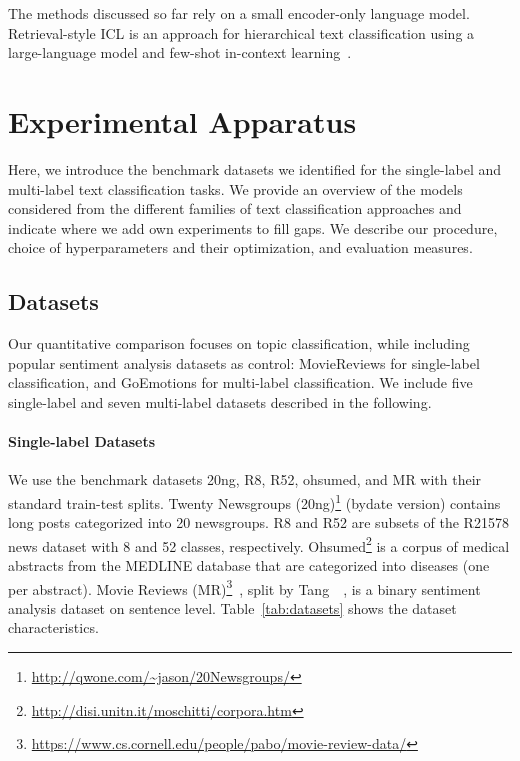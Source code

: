 \documentclass[acmsmall,nonacm]{acmart}
\begin{document}
The methods discussed so far rely on a small encoder-only language model.
Retrieval-style ICL is an approach for hierarchical text classification using a large-language model and few-shot in-context learning~\cite{DBLP:journals/corr/abs-2406-17534}.

\section{Experimental Apparatus}\label{sec:apparatus}

Here, we introduce the benchmark datasets we identified for the single-label and multi-label text classification tasks.
We provide an overview of the models considered from the different families of text classification approaches and indicate where we add own experiments to fill gaps.
We describe our procedure, choice of hyperparameters and their optimization, and evaluation measures.

\subsection{Datasets}\label{sec:datasets}

Our quantitative comparison focuses on topic classification, while including popular sentiment analysis datasets as control: MovieReviews for single-label classification, and GoEmotions for multi-label classification.
We include five single-label and seven multi-label datasets described in the following.

\paragraph{Single-label Datasets} 
We use the benchmark datasets 20ng, R8, R52, ohsumed, and MR with their standard train-test splits.
Twenty Newsgroups (20ng)\footnote{\url{http://qwone.com/~jason/20Newsgroups/}} (bydate version) contains long posts categorized into 20 newsgroups.
R8 and R52 are subsets of the R21578 news dataset with 8 and 52 classes, respectively.  
Ohsumed\footnote{\url{http://disi.unitn.it/moschitti/corpora.htm}} is a corpus of medical abstracts from the MEDLINE database that are categorized into diseases (one per abstract). 
Movie Reviews (MR)\footnote{\url{https://www.cs.cornell.edu/people/pabo/movie-review-data/}}~\cite{pang-lee-2005-seeing}, split by Tang~\etal~\cite{DBLP:conf/kdd/TangQM15}, is a binary sentiment analysis dataset on sentence level. 
Table~\ref{tab:datasets} shows the dataset characteristics. 
\end{document}
